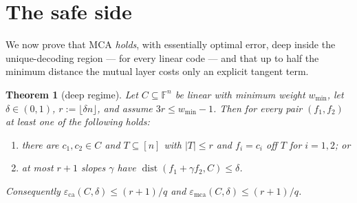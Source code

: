 \documentclass[11pt]{amsart}
\newtheorem{theorem}{Theorem}[section]
\theoremstyle{definition}
\theoremstyle{remark}
\newcommand{\F}{\mathbb{F}}
\newcommand{\dist}{\operatorname{dist}}
\newcommand{\eca}{\varepsilon_{\mathrm{ca}}}
\newcommand{\emca}{\varepsilon_{\mathrm{mca}}}
\begin{document}
\section{The safe side}\label{sec:safe}

We now prove that MCA \emph{holds}, with essentially optimal error, deep inside the unique-decoding region --- for every linear code --- and that up to half the minimum distance the mutual layer costs only an explicit tangent term.

\begin{theorem}[deep regime]\label{thm:deep}
Let $C\subseteq\F^n$ be linear with minimum weight $w_{\min}$, let $\delta\in(0,1)$, $r:=\lfloor\delta n\rfloor$, and assume $3r\le w_{\min}-1$. Then for every pair $(f_1,f_2)$ at least one of the following holds:
\begin{enumerate}
\item there are $c_1,c_2\in C$ and $T\subseteq[n]$ with $|T|\le r$ and $f_i=c_i$ off $T$ for $i=1,2$; or
\item at most $r+1$ slopes $\gamma$ have $\dist(f_1+\gamma f_2,C)\le\delta$.
\end{enumerate}
Consequently $\eca(C,\delta)\le(r+1)/q$ and $\emca(C,\delta)\le(r+1)/q$.
\end{theorem}
\end{document}
